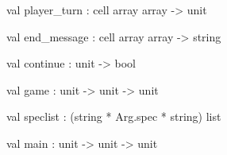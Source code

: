 \documentclass[11pt]{article}
\begin{document}
\label{val:Othello.player-underscoreturn}\begin{ocamldoccode}
val player_turn : cell array array -> unit
\end{ocamldoccode}




\label{val:Othello.end-underscoremessage}\begin{ocamldoccode}
val end_message : cell array array -> string
\end{ocamldoccode}




\label{val:Othello.continue}\begin{ocamldoccode}
val continue : unit -> bool
\end{ocamldoccode}




\label{val:Othello.game}\begin{ocamldoccode}
val game : unit -> unit -> unit
\end{ocamldoccode}




\label{val:Othello.speclist}\begin{ocamldoccode}
val speclist : (string * Arg.spec * string) list
\end{ocamldoccode}




\label{val:Othello.main}\begin{ocamldoccode}
val main : unit -> unit -> unit
\end{ocamldoccode}
\end{document}
